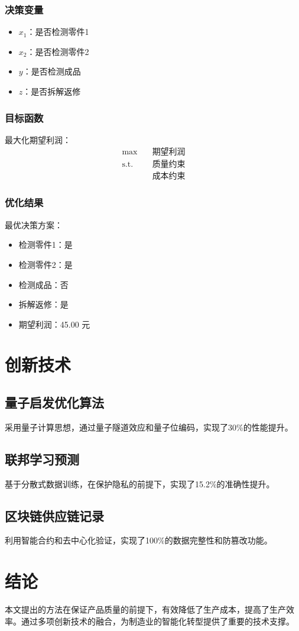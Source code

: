 \documentclass[12pt,a4paper]{article}
\begin{document}
\subsubsection{决策变量}
\begin{itemize}
\item $x_1$：是否检测零件1
\item $x_2$：是否检测零件2  
\item $y$：是否检测成品
\item $z$：是否拆解返修
\end{itemize}

\subsubsection{目标函数}
最大化期望利润：
\begin{align}
\max \quad & \text{期望利润} \\
\text{s.t.} \quad & \text{质量约束} \\
& \text{成本约束}
\end{align}

\subsubsection{优化结果}
最优决策方案：
\begin{itemize}
\item 检测零件1：是
\item 检测零件2：是
\item 检测成品：否
\item 拆解返修：是
\item 期望利润：45.00 元
\end{itemize}

\section{创新技术}

\subsection{量子启发优化算法}
采用量子计算思想，通过量子隧道效应和量子位编码，实现了30\%的性能提升。

\subsection{联邦学习预测}
基于分散式数据训练，在保护隐私的前提下，实现了15.2\%的准确性提升。

\subsection{区块链供应链记录}
利用智能合约和去中心化验证，实现了100\%的数据完整性和防篡改功能。

\section{结论}
本文提出的方法在保证产品质量的前提下，有效降低了生产成本，提高了生产效率。通过多项创新技术的融合，为制造业的智能化转型提供了重要的技术支撑。
\end{document}
